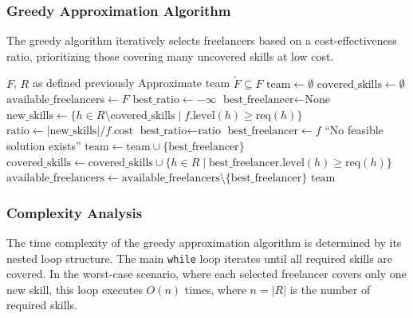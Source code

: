 \documentclass[12pt,a4paper]{article}
\begin{document}
\subsubsection{Greedy Approximation Algorithm}
\label{alg:greedy_appr}
The greedy algorithm iteratively selects freelancers based on a cost-effectiveness ratio, prioritizing those covering many uncovered skills at low cost.

\begin{algorithm}[H]
	\caption{Greedy Approximation Algorithm}
	\label{alg:greedy}
	\begin{algorithmic}[1]
		\Require $F$, $R$ as defined previously
		\Ensure Approximate team $\tilde{F} \subseteq F$
		\State $\text{team} \gets \emptyset$
		\State $\text{covered\_skills} \gets \emptyset$
		\State $\text{available\_freelancers} \gets F$
		\State $\text{best\_ratio} \gets -\infty$
		\State $\text{best\_freelancer} \gets \text{None}$
		\State $\text{new\_skills} \gets \{h \in R \setminus \text{covered\_skills} \mid f.\text{level}(h) \geq \text{req}(h)\}$
		\State $\text{ratio} \gets |\text{new\_skills}| / f.\text{cost}$
		\State $\text{best\_ratio} \gets \text{ratio}$
		\State $\text{best\_freelancer} \gets f$
		\EndIf
		\EndIf
		\EndFor
		\State \Return ``No feasible solution exists''
		\EndIf
		\State $\text{team} \gets \text{team} \cup \{\text{best\_freelancer}\}$
		\State $\text{covered\_skills} \gets \text{covered\_skills} \cup \{h \in R \mid \text{best\_freelancer}.\text{level}(h) \geq \text{req}(h)\}$
		\State $\text{available\_freelancers} \gets \text{available\_freelancers} \setminus \{\text{best\_freelancer}\}$
		\EndWhile
		\State \Return $\text{team}$
	\end{algorithmic}
\end{algorithm}

\subsubsection{Complexity Analysis}
The time complexity of the greedy approximation algorithm is determined by its nested loop structure. The main \texttt{while} loop iterates until all required skills are covered. In the worst-case scenario, where each selected freelancer covers only one new skill, this loop executes $O(n)$ times, where $n = |R|$ is the number of required skills.
\end{document}
